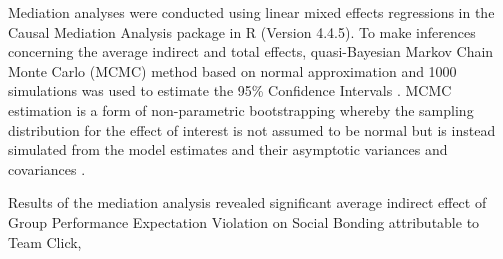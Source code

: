 \documentclass[english]{article}\usepackage[]{graphicx}\usepackage[]{color}
\makeatletter
\newenvironment{kframe}{%
 \def\at@end@of@kframe{}%
 \ifinner\ifhmode%
  \def\at@end@of@kframe{\end{minipage}}%
  \begin{minipage}{\columnwidth}%
 \fi\fi%
 \def\FrameCommand##1{\hskip\@totalleftmargin \hskip-\fboxsep
 \colorbox{shadecolor}{##1}\hskip-\fboxsep
     \hskip-\linewidth \hskip-\@totalleftmargin \hskip\columnwidth}%
 \MakeFramed {\advance\hsize-\width
   \@totalleftmargin\z@ \linewidth\hsize
   \@setminipage}}%
 {\par\unskip\endMakeFramed%
 \at@end@of@kframe}
\newenvironment{knitrout}{}{} %
\makeatother
\begin{document}
\begin{knitrout}
\color{fgcolor}\begin{kframe}


{\ttfamily\noindent\bfseries{}}\end{kframe}
\end{knitrout}

\begin{knitrout}
\color{fgcolor}\begin{kframe}


{\ttfamily\noindent\bfseries{}}\end{kframe}
\end{knitrout}

\begin{knitrout}
\color{fgcolor}\begin{kframe}


{\ttfamily\noindent\bfseries{}}\end{kframe}
\end{knitrout}










Mediation analyses were conducted using linear mixed effects regressions in the Causal Mediation Analysis package in R (Version 4.4.5).  To make inferences concerning the average indirect and total effects, quasi-Bayesian Markov Chain Monte Carlo (MCMC) method based on normal approximation and 1000 simulations was used to estimate the 95\% Confidence Intervals \citep{Tofighi2016a,Imai2010}. MCMC estimation is a form of non-parametric bootstrapping whereby the sampling distribution for the effect of interest is not assumed to be normal but is instead simulated from the model estimates and their asymptotic variances and covariances \cite{Preacher2008}.

Results of the mediation analysis revealed significant average indirect effect of Group Performance Expectation Violation on Social Bonding attributable to Team Click,
\end{document}
